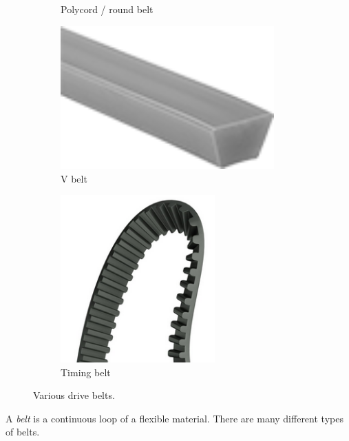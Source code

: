 \begin{figure}[H]
\begin{subfigure}[b]{.24\linewidth}
		\caption{Polycord / round belt}
	\end{subfigure}\begin{subfigure}[b]{.24\linewidth}
		\includegraphics[width=0.9\textwidth]{imgs/belt_v.png}
		\caption{V belt}
	\end{subfigure}\begin{subfigure}[b]{.24\linewidth}
		\includegraphics[width=0.65\textwidth]{imgs/belt_timing.png}
		\caption{Timing belt}
	\end{subfigure}
	\caption{Various drive belts.}
\end{figure}

A \textit{belt} is a continuous loop of a flexible material. There are many different types of belts.

